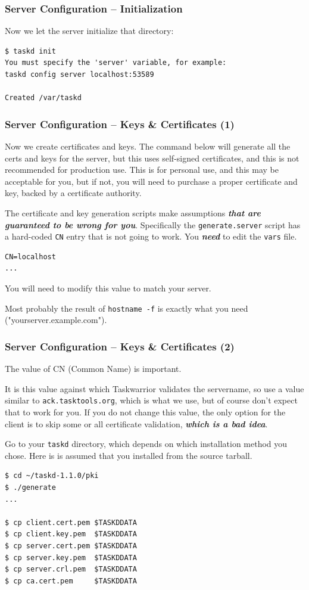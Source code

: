 \documentclass[t,handout]{beamer}
\begin{document}
\begin{frame}[fragile]\frametitle{Server Configuration -- Initialization}
    Now we let the server initialize that directory:

    \begin{lstlisting}
$ taskd init
You must specify the 'server' variable, for example:
taskd config server localhost:53589

Created /var/taskd\end{lstlisting}

\end{frame}

\begin{frame}[fragile]\frametitle{Server Configuration -- Keys \& Certificates (1)}
    Now we create certificates and keys. The command below will generate all the certs and keys for the server, but this uses self-signed certificates, and this is not recommended for production use. This is for personal use, and this may be acceptable for you, but if not, you will need to purchase a proper certificate and key, backed by a certificate authority.

    The certificate and key generation scripts make assumptions \textbf{\emph{that are guaranteed to be wrong for you}}. Specifically the \verb+generate.server+ script has a hard-coded \verb+CN+ entry that is not going to work. You \textbf{\emph{need}} to edit the \verb+vars+ file.

\begin{lstlisting}
CN=localhost
...\end{lstlisting}

    You will need to modify this value to match your server.

    Most probably the result of \verb+hostname -f+ is exactly what you need ("yourserver.example.com").
\end{frame}

\begin{frame}[fragile]\frametitle{Server Configuration -- Keys \& Certificates (2)}
    The value of CN (Common Name) is important.

    It is this value against which Taskwarrior validates the servername, so use a value similar to \verb+ack.tasktools.org+, which is what we use, but of course don't expect that to work for you. If you do not change this value, the only option for the client is to skip some or all certificate validation, \textbf{\emph{which is a bad idea}}.

    Go to your \verb+taskd+ directory, which depends on which installation method you chose. Here is is assumed that you installed from the source tarball.

    \begin{lstlisting}
$ cd ~/taskd-1.1.0/pki
$ ./generate
...

$ cp client.cert.pem $TASKDDATA
$ cp client.key.pem  $TASKDDATA
$ cp server.cert.pem $TASKDDATA
$ cp server.key.pem  $TASKDDATA
$ cp server.crl.pem  $TASKDDATA
$ cp ca.cert.pem     $TASKDDATA\end{lstlisting}
\end{frame}
\end{document}
